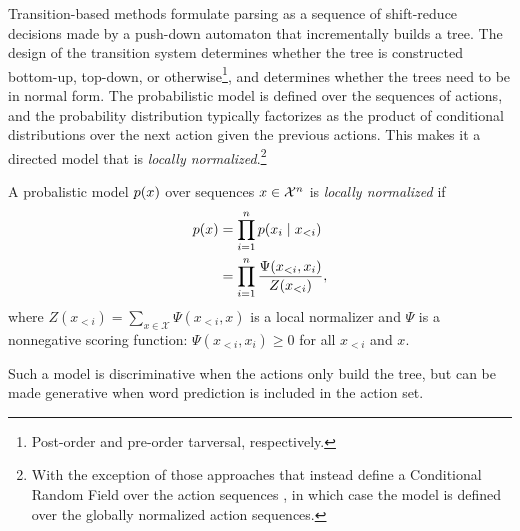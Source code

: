     Transition-based methods formulate parsing as a sequence of shift-reduce decisions made by a push-down automaton that incrementally builds a tree. The design of the transition system determines whether the tree is constructed bottom-up, top-down, or otherwise\footnote{Post-order and pre-order tarversal, respectively.}, and determines whether the trees need to be in normal form. The probabilistic model is defined over the sequences of actions, and the probability distribution typically factorizes as the product of conditional distributions over the next action given the previous actions. This makes it a directed model that is \textit{locally normalized}.\footnote{With the exception of those approaches that instead define a Conditional Random Field over the action sequences \citep{andor2016globally}, in which case the model is defined over the globally normalized action sequences.}
    \begin{definition}{}
      A probalistic model $p(x)$ over sequences $x \in \mathcal{X}^n$ is \textit{locally normalized} if
      \begin{align*}
        p(x)
          &= \prod_{i=1}^{n} p(x_i \mid x_{<i})  \\
          &= \prod_{i=1}^{n} \frac{ \Psi( x_{<i}, x_{i} ) }{ Z( x_{<i} ) },
      \end{align*}
      where $Z( x_{<i} ) = \sum_{x \in \mathcal{X}} \Psi( x_{<i}, x )$  is a local normalizer and $\Psi$ is a nonnegative scoring function: $\Psi( x_{<i}, x_{i} ) \geq 0$ for all $x_{<i}$ and $x$.
    \end{definition}
    Such a model is discriminative when the actions only build the tree, but can be made generative when word prediction is included in the action set.

